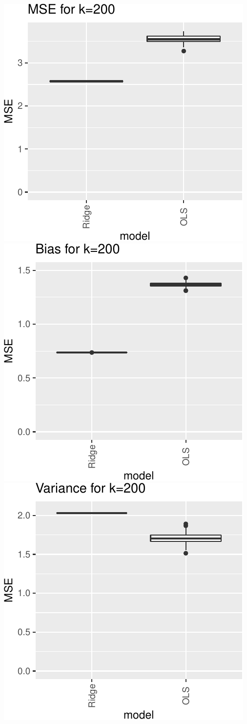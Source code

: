 \documentclass[
]{article}
\begin{document}
\includegraphics[width=0.8\linewidth]{report_files/figure-latex/unnamed-chunk-3-7}
\includegraphics[width=0.8\linewidth]{report_files/figure-latex/unnamed-chunk-3-8}
\includegraphics[width=0.8\linewidth]{report_files/figure-latex/unnamed-chunk-3-9}
\end{document}
